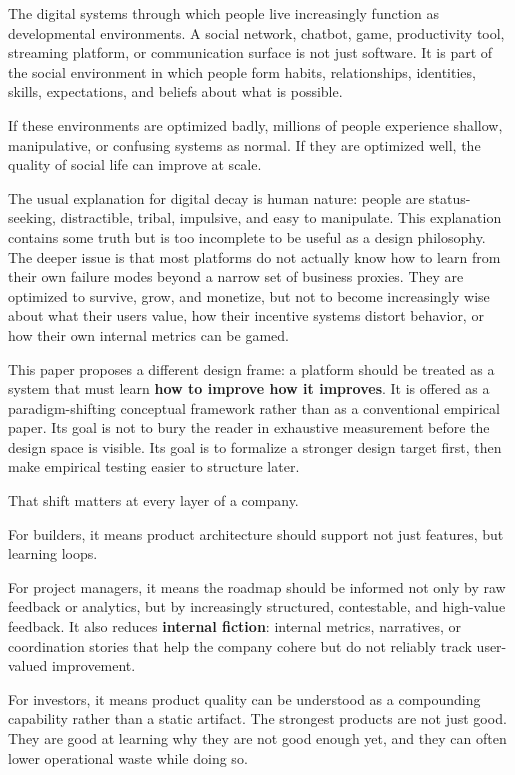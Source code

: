\documentclass[11pt]{article}
\begin{document}
The digital systems through which people live increasingly function as developmental environments. A social network, chatbot, game, productivity tool, streaming platform, or communication surface is not just software. It is part of the social environment in which people form habits, relationships, identities, skills, expectations, and beliefs about what is possible.

If these environments are optimized badly, millions of people experience shallow, manipulative, or confusing systems as normal. If they are optimized well, the quality of social life can improve at scale.

The usual explanation for digital decay is human nature: people are status-seeking, distractible, tribal, impulsive, and easy to manipulate. This explanation contains some truth but is too incomplete to be useful as a design philosophy. The deeper issue is that most platforms do not actually know how to learn from their own failure modes beyond a narrow set of business proxies. They are optimized to survive, grow, and monetize, but not to become increasingly wise about what their users value, how their incentive systems distort behavior, or how their own internal metrics can be gamed.

This paper proposes a different design frame: a platform should be treated as a system that must learn \textbf{how to improve how it improves}. It is offered as a paradigm-shifting conceptual framework rather than as a conventional empirical paper. Its goal is not to bury the reader in exhaustive measurement before the design space is visible. Its goal is to formalize a stronger design target first, then make empirical testing easier to structure later.

That shift matters at every layer of a company.

For builders, it means product architecture should support not just features, but learning loops.

For project managers, it means the roadmap should be informed not only by raw feedback or analytics, but by increasingly structured, contestable, and high-value feedback. It also reduces \textbf{internal fiction}: internal metrics, narratives, or coordination stories that help the company cohere but do not reliably track user-valued improvement.

For investors, it means product quality can be understood as a compounding capability rather than a static artifact. The strongest products are not just good. They are good at learning why they are not good enough yet, and they can often lower operational waste while doing so.
\end{document}
